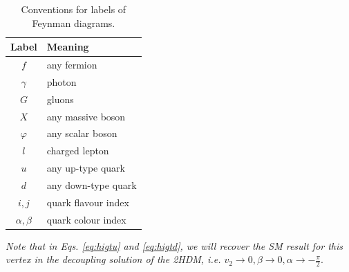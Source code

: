 \documentclass[a4paper,12pt]{article}
\begin{document}
\begin{table}[H]
    \centering
    \begin{tabular}{c|l}
        \hline\hline
        \textbf{Label} & \textbf{Meaning} \\
        \hline\hline
        $f$ & any fermion \\
        $\gamma$ & photon \\
        $G$ & gluons \\
        $X$ & any massive boson \\
        $\varphi$ & any scalar boson \\
        $l$ & charged lepton \\
        $u$ & any up-type quark \\
        $d$ & any down-type quark \\ 
        $i,j$ & quark flavour index \\
        $\alpha,\beta$ & quark colour index \\
        \hline\hline
    \end{tabular}
    \caption{\label{tab:feyns}Conventions for labels of Feynman diagrams.}
\end{table}
\emph{Note that in Eqs. \ref{eq:higtu} and \ref{eq:higtd}, we will recover the SM result for this vertex in the decoupling solution of the 2HDM, i.e. $v_2\to0,\beta\to0,\alpha\to-\frac{\pi}{2}.$}
\end{document}
